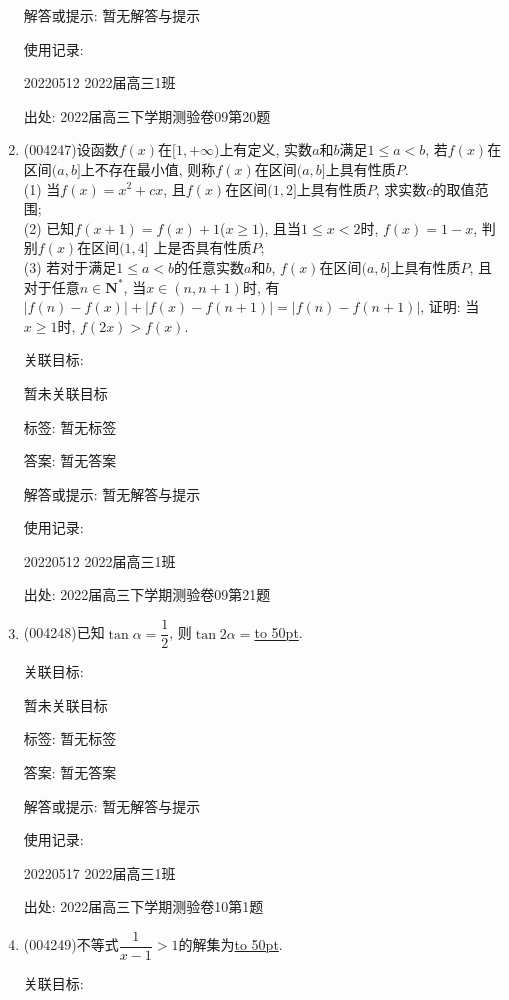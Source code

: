 \documentclass[10pt,a4paper]{article}
\newcommand{\blank}[1]{\underline{\hbox to #1pt{}}}
\begin{document}
\begin{enumerate}[1.]
解答或提示: 暂无解答与提示

使用记录:

20220512	2022届高三1班			


出处: 2022届高三下学期测验卷09第20题
\item { (004247)}设函数$f(x)$在$[1,+\infty)$上有定义, 实数$a$和$b$满足$1\le a<b$, 若$f(x)$在区间$(a,b]$上不存在最小值, 则称$f(x)$在区间$(a,b]$上具有性质$P$.\\
(1) 当$f(x)=x^2+cx$, 且$f(x)$在区间$(1,2]$上具有性质$P$, 求实数$c$的取值范围;\\
(2) 已知$f(x+1)=f(x)+1$($x\ge 1$), 且当$1\le x<2$时, $f(x)=1-x$, 判别$f(x)$在区间$(1,4]$ 上是否具有性质$P$;\\
(3) 若对于满足$1\le a<b$的任意实数$a$和$b$, $f(x)$在区间$(a,b]$上具有性质$P$, 且对于任意$n\in \mathbf{N}^*$, 当$x\in (n,n+1)$时, 有$|f(n)-f(x)|+|f(x)-f(n+1)|=|f(n)-f(n+1)|$, 证明: 当$x\ge 1$时, $f(2x)>f(x)$.


关联目标:

暂未关联目标



标签: 暂无标签

答案: 暂无答案

解答或提示: 暂无解答与提示

使用记录:

20220512	2022届高三1班			


出处: 2022届高三下学期测验卷09第21题
\item { (004248)}已知$\tan \alpha =\dfrac 12$, 则$\tan 2\alpha =$\blank{50}.


关联目标:

暂未关联目标



标签: 暂无标签

答案: 暂无答案

解答或提示: 暂无解答与提示

使用记录:

20220517	2022届高三1班	


出处: 2022届高三下学期测验卷10第1题
\item { (004249)}不等式$\dfrac 1{x-1}>1$的解集为\blank{50}.


关联目标:


\end{enumerate}
\end{document}
